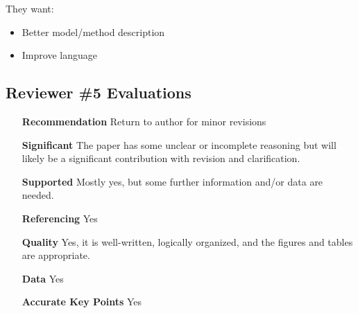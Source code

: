 \documentclass{reviewresponse}
\newenvironment{evaluation}{%
  \begin{tcolorbox}[attach title to upper, title={Evaluations}, after title={.\enskip},
    fonttitle={\bfseries}, coltitle={colorevalfg}, colback={colorevalbg},
    colframe={colorevalframe},]
  }{
  \end{tcolorbox}
}
\begin{document}
  \reviewer[5] \label{rev:5}

  They want:
  \begin{itemize}
    \item
    Better model/method description
    \item
    Improve language
  \end{itemize}

  \subsection*{Reviewer \#5 Evaluations}

  \begin{evaluation}
    \begin{itemize}[leftmargin=4.5cm,noitemsep]
      \item
      [\textbf{Recommendation}] Return to author for minor revisions
      \item
      [\textbf{Significant}] The paper has some unclear or incomplete reasoning but will
      likely be a significant contribution with revision and clarification.
      \item
      [\textbf{Supported}] Mostly yes, but some further information and/or data are
      needed.
      \item
      [\textbf{Referencing}] Yes
      \item
      [\textbf{Quality}] Yes, it is well-written, logically organized, and the figures
      and tables are appropriate.
      \item
      [\textbf{Data}] Yes
      \item
      [\textbf{Accurate Key Points}] Yes
    \end{itemize}
  \end{evaluation}
\end{document}

